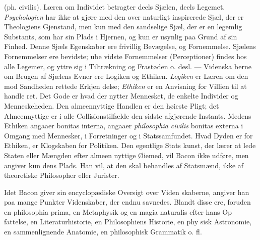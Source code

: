\documentclass[12pt,a4paper]{book}
\begin{document}
(ph. civilis). Læren om Individet betragter deels Sjælen, deels
Legemet. \emph{Psychologien} har ikke at gjøre med den over\-%
naturligt inspirerede Sjæl, der er Theologiens Gjenstand, men
kun med den sandselige Sjæl, der er en legemlig Substants,
som har sin Plads i Hjernen, og kun er usynlig paa Grund af
sin Finhed. Denne Sjæls Egenskaber ere frivillig Bevægelse,
og Fornemmelse. Sjælens Fornemmelser ere bevidste; ube\-%
vidste Fornemmelser (Perceptioner) findes hos alle Legemer,
og yttre sig i Tiltrækning og Frastøden o. desl. --- Videnska\-%
berne om Brugen af Sjælens Evner ere Logiken og Ethiken.
\emph{Logiken} er Læren om den mod Sandheden rettede Erkjen\-%
delse; \emph{Ethiken} er en Anvisning for Villien til at handle ret.
Det Gode er hvad der nytter Mennesket, de enkelte Individer
og Menneskeheden. Den almeennyttige Handlen er den høieste
Pligt; det Almeennyttige er i alle Collisionstilfælde den sidste
afgjørende Instants. Medens Ethiken angaaer bonitas interna,
angaaer \emph{philosophia civilis} bonitas externa i Omgang med
Mennesker, i Forretninger og i Statssamfundet. Hvad Dyden er
for Ethiken, er Klogskaben for Politiken. Den egentlige Stats\-%
kunst, der lærer at lede Staten eller Mængden efter almeen\-%
nyttige Øiemed, vil Bacon ikke udføre, men angiver kun dens
Plads. Han vil, at den skal behandles af Statsmænd, ikke af
theoretiske Philosopher eller Jurister.

Idet Bacon giver sin encyclopædiske Oversigt over Viden\-%
skaberne, angiver han paa mange Punkter Videnskaber, der
endnu savnedes. Blandt disse ere, foruden en philosophia
prima, en Metaphysik og en magia naturalis efter hans Op\-%
fattelse, en Literaturhistorie, en Philosophiens Historie, en phy\-%
sisk Astronomie, en sammenlignende Anatomie, en philosophisk
Grammatik o. fl.
\end{document}
